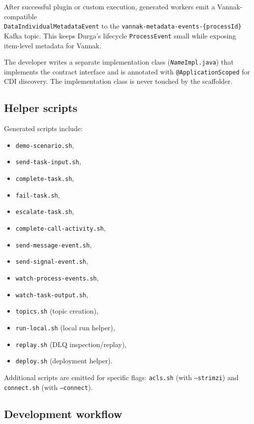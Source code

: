 After successful plugin or custom execution, generated workers emit a
Vannak-compatible \\ \texttt{DataIndividualMetadataEvent} to the
\texttt{vannak-metadata-events-\{processId\}} Kafka topic. This keeps Durga's lifecycle
\texttt{ProcessEvent} small while exposing item-level metadata for Vannak.

The developer writes a separate implementation class (\texttt{\textit{Name}Impl.java})
that implements the contract interface and is annotated with \texttt{@ApplicationScoped}
for CDI discovery. The implementation class is never touched by the scaffolder.

\subsection{Helper scripts}

Generated scripts include:
\begin{itemize}
\item \texttt{demo-scenario.sh},
\item \texttt{send-task-input.sh},
\item \texttt{complete-task.sh},
\item \texttt{fail-task.sh},
\item \texttt{escalate-task.sh},
\item \texttt{complete-call-activity.sh},
\item \texttt{send-message-event.sh},
\item \texttt{send-signal-event.sh},
\item \texttt{watch-process-events.sh},
\item \texttt{watch-task-output.sh},
\item \texttt{topics.sh} (topic creation),
\item \texttt{run-local.sh} (local run helper),
\item \texttt{replay.sh} (DLQ inspection/replay),
\item \texttt{deploy.sh} (deployment helper).
\end{itemize}

Additional scripts are emitted for specific flags: \texttt{acls.sh} (with
\texttt{--strimzi}) and \texttt{connect.sh} (with \texttt{--connect}).

\subsection{Development workflow}

